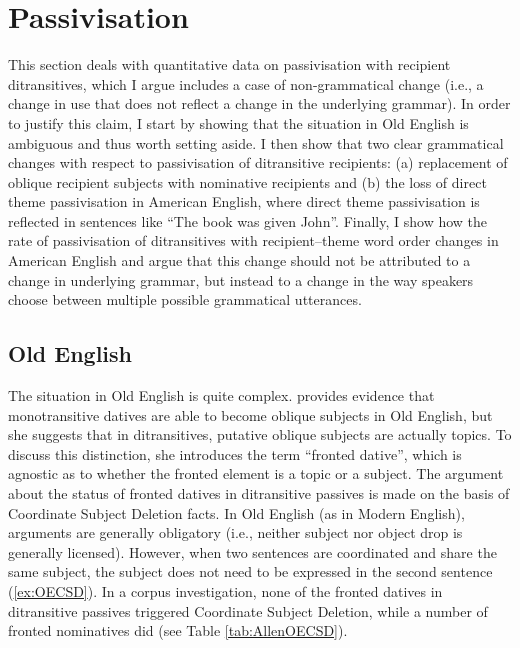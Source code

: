 \section{Passivisation}

	This section deals with quantitative data on passivisation with recipient ditransitives, which I argue includes a case of non-grammatical change (i.e., a change in use that does not reflect a change in the underlying grammar). In order to justify this claim, I start by showing that the situation in Old English is ambiguous and thus worth setting aside. I then show that two clear grammatical changes with respect to passivisation of ditransitive recipients: (a) replacement of oblique recipient subjects with nominative recipients and (b) the loss of direct theme passivisation in American English, where direct theme passivisation is reflected in sentences like ``The book was given John''. Finally, I show how the rate of passivisation of ditransitives with recipient--theme word order changes in American English and argue that this change should not be attributed to a change in underlying grammar, but instead to a change in the way speakers choose between multiple possible grammatical utterances. 

\subsection{Old English}
	The situation in Old English is quite complex. \cite{Allen.1999} provides evidence that monotransitive datives are able to become oblique subjects in Old English, but she suggests that in ditransitives, putative oblique subjects are actually topics. To discuss this distinction, she introduces the term ``fronted dative'', which is agnostic as to whether the fronted element is a topic or a subject. The argument about the status of fronted datives in ditransitive passives is made on the basis of Coordinate Subject Deletion facts. In Old English (as in Modern English), arguments are generally obligatory (i.e., neither subject nor object drop is generally licensed). However, when two sentences are coordinated and share the same subject, the subject does not need to be expressed in the second sentence (\ref{ex:OECSD}). In a corpus investigation, none of the fronted datives in ditransitive passives triggered Coordinate Subject Deletion, while a number of fronted nominatives did (see Table \ref{tab:AllenOECSD}). 

